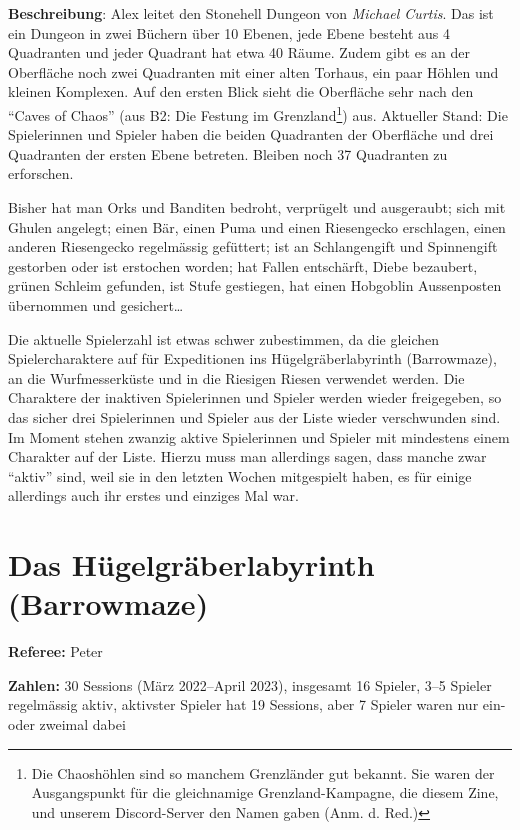 \documentclass[11pt]{wbzine}
\begin{document}
\begin{multicols}{2}
    \textbf{Beschreibung}: Alex leitet den Stonehell Dungeon von
    \textit{Michael Curtis}. Das ist ein Dungeon in zwei Büchern
    über 10 Ebenen, jede Ebene besteht aus 4 Quadranten und jeder
    Quadrant hat etwa 40 Räume. Zudem gibt es an der Oberfläche noch
    zwei Quadranten mit einer alten Torhaus, ein paar Höhlen und
    kleinen Komplexen. Auf den ersten Blick sieht die Oberfläche
    sehr nach den “Caves of Chaos” (aus B2: Die Festung im
    Grenzland\footnote{Die Chaoshöhlen sind so manchem Grenzländer
    gut bekannt. Sie waren der Ausgangspunkt für die gleichnamige
    Grenzland-Kampagne, die diesem Zine, und unserem Discord-Server
    den Namen gaben (Anm. d. Red.)}) aus. Aktueller Stand: Die
    Spielerinnen und Spieler haben die beiden Quadranten der
    Oberfläche und drei Quadranten der ersten Ebene betreten.
    Bleiben noch 37 Quadranten zu erforschen.

    Bisher hat man Orks und Banditen bedroht, verprügelt und
    ausgeraubt; sich mit Ghulen angelegt; einen Bär, einen Puma und
    einen Riesengecko erschlagen, einen anderen Riesengecko
    regelmässig gefüttert; ist an Schlangengift und Spinnengift
    gestorben oder ist erstochen worden; hat Fallen entschärft,
    Diebe bezaubert, grünen Schleim gefunden, ist Stufe gestiegen,
    hat einen Hobgoblin Aussenposten übernommen und gesichert…

    Die aktuelle Spielerzahl ist etwas schwer zubestimmen, da die
    gleichen Spielercharaktere auf für Expeditionen ins
    Hügelgräberlabyrinth (Barrowmaze), an die Wurfmesserküste und in
    die Riesigen Riesen verwendet werden. Die Charaktere der
    inaktiven Spielerinnen und Spieler werden wieder freigegeben, so
    das sicher drei Spielerinnen und Spieler aus der Liste wieder
    verschwunden sind. Im Moment stehen zwanzig aktive Spielerinnen
    und Spieler mit mindestens einem Charakter auf der Liste. Hierzu
    muss man allerdings sagen, dass manche zwar “aktiv” sind, weil sie in
    den letzten Wochen mitgespielt haben, es für einige allerdings
    auch ihr erstes und einziges Mal war.


\section{Das Hügelgräberlabyrinth (Barrowmaze)}

\textbf{Referee:} Peter

\textbf{Zahlen:} 30 Sessions (März 2022--April 2023),
insgesamt 16 Spieler,
3--5 Spieler regelmässig aktiv,
aktivster Spieler hat 19 Sessions,
aber 7 Spieler waren nur ein- oder zweimal dabei


\end{multicols}
\end{document}
